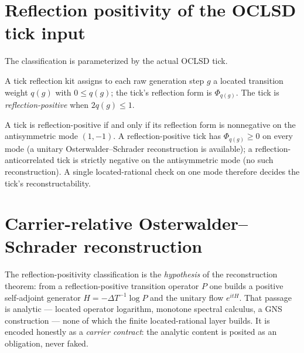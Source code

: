 \section{Reflection positivity of the OCLSD tick input}

The classification is parameterized by the actual OCLSD tick.

\begin{definition}
\label{def:oclsd-tick-reflection-kit}
A tick reflection kit assigns to each raw generation step $g$ a located transition
weight $q(g)$ with $0\le q(g)$; the tick's reflection form is $\Phi_{q(g)}$. The tick
is \emph{reflection-positive} when $2q(g)\le 1$.
\end{definition}

\begin{theorem}
\label{thm:oclsd-tick-reflection-characterization}
A tick is reflection-positive if and only if its reflection form is nonnegative on the
antisymmetric mode $(1,-1)$. A reflection-positive tick has $\Phi_{q(g)}\ge 0$ on every
mode (a unitary Osterwalder--Schrader reconstruction is available); a
reflection-anticorrelated tick is strictly negative on the antisymmetric mode (no such
reconstruction). A single located-rational check on one mode therefore decides the
tick's reconstructability.
\end{theorem}

\section{Carrier-relative Osterwalder--Schrader reconstruction}

The reflection-positivity classification is the \emph{hypothesis} of the reconstruction theorem:
from a reflection-positive transition operator $P$ one builds a positive self-adjoint generator
$H=-\Delta T^{-1}\log P$ and the unitary flow $e^{itH}$. That passage is analytic ---
located operator logarithm, monotone spectral calculus, a GNS construction --- none of which the
finite located-rational layer builds. It is encoded honestly as a \emph{carrier contract}: the
analytic content is posited as an obligation, never faked.

